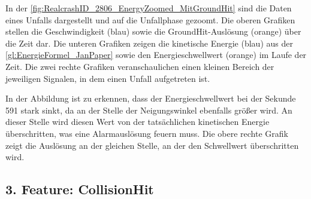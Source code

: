 
In der \autoref{fig:RealcrashID_2806_EnergyZoomed_MitGroundHit} sind die Daten eines Unfalls dargestellt und auf die Unfallphase gezoomt. 
Die oberen Grafiken stellen die Geschwindigkeit (blau) sowie die GroundHit-Auslösung (orange) über die Zeit dar.
Die unteren Grafiken zeigen die kinetische Energie (blau) aus der \autoref{gl:EnergieFormel_JanPaper} sowie den Energieschwellwert (orange) im Laufe der Zeit.
Die zwei rechte Grafiken veranschaulichen einen kleinen Bereich der jeweiligen Signalen, in dem einen Unfall aufgetreten ist.

In der Abbildung ist zu erkennen, dass der Energieschwellwert bei der Sekunde 591 stark sinkt, da an der Stelle der Neigungswinkel ebenfalls größer wird.
An dieser Stelle wird diesen Wert von der tatsächlichen kinetischen Energie überschritten, was eine Alarmauslösung feuern muss. Die obere rechte Grafik zeigt die Auslösung an der gleichen Stelle, an der den Schwellwert überschritten wird.



\subsection{3. Feature: CollisionHit} %

